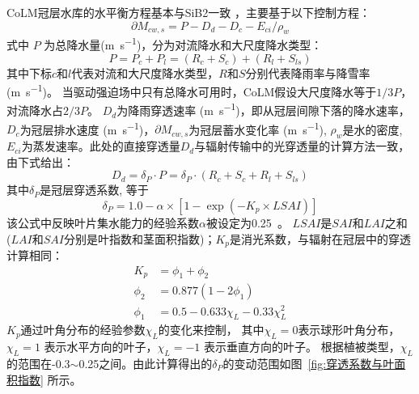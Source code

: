 CoLM冠层水库的水平衡方程基本与SiB2一致 \citep{sellers1996revised}，主要基于以下控制方程：
\begin{equation}
\partial M_{cw,s}=P-D_{d}-D_{c}-E_{ci} / \rho_{w}
\end{equation}
式中 $P$ 为总降水量(\unit{m.s^{-1}})，分为对流降水和大尺度降水类型：
\begin{equation}
P=P_{c}+P_{l}=\left(R_{c}+S_{c}\right)+\left(R_{l}+S_{l s}\right)
\end{equation}
其中下标$c$和$l$代表对流和大尺度降水类型，$R$和$S$分别代表降雨率与降雪率 (\unit{m.s^{-1}})。
当驱动强迫场中只有总降水可用时，CoLM假设大尺度降水等于$1/3P$，对流降水占$2/3P$。
$D_d$为降雨穿透速率 (\unit{m.s^{-1}})，即从冠层间隙下落的降水速率，$D_c$为冠层排水速度 (\unit{m.s^{-1}})，$\partial M_{cw,s}$为冠层蓄水变化率 (\unit{m.s^{-1}}), 
$\rho_w$是水的密度, $E_{ci}$为蒸发速率。此处的直接穿透量$D_d$与辐射传输中的光穿透量的计算方法一致，由下式给出：
\begin{equation}
D_{d}=\delta_{P} \cdot P=\delta_{P} \cdot\left(R_{c}+S_{c}+R_{l}+S_{l s}\right)
\end{equation}
其中$\delta_P$是冠层穿透系数, 等于
\begin{equation}
\delta_{P}=1.0-\alpha \times\left[1-\exp \left(-K_{p} \times LSAI\right)\right]
\end{equation}
该公式中反映叶片集水能力的经验系数$\alpha$被设定为0.25~\citep{lawrence2011parameterization}。
$LSAI$是$SAI$和$LAI$之和 ($LAI$和$SAI$分别是叶指数和茎面积指数)；$K_p$是消光系数，与辐射在冠层中的穿透计算相同：
\begin{equation}
\begin{aligned}
K_{p} &= \phi_{1}+\phi_{2} \\
\phi_{2} &= 0.877\left(1-2 \phi_{1}\right) \\
\phi_{1} &= 0.5-0.633 \chi_{L}-0.33 \chi_{L}^{2}
\end{aligned}
\end{equation}
$K_p$通过叶角分布的经验参数$\chi_L$的变化来控制，
其中$\chi_L=0$表示球形叶角分布，$\chi_L= 1$ 表示水平方向的叶子，$\chi_L= -1$ 表示垂直方向的叶子。
根据植被类型，$\chi_L$的范围在-0.3$\sim$0.25之间。由此计算得出的$\delta_P$的变动范围如图~\ref{fig:穿透系数与叶面积指数} 所示。%
